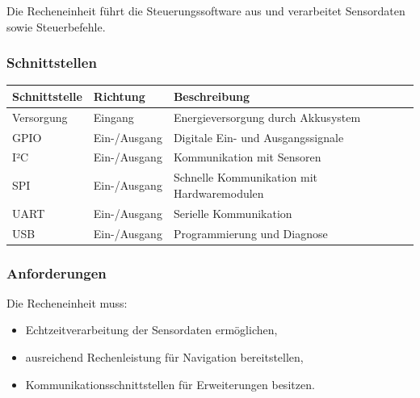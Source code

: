 \documentclass[
]{article}
\providecommand{\tightlist}{%
  \setlength{\itemsep}{0pt}\setlength{\parskip}{0pt}}
\begin{document}
Die Recheneinheit führt die Steuerungssoftware aus und verarbeitet
Sensordaten sowie Steuerbefehle.

\subsubsection{Schnittstellen}\label{schnittstellen-1}

\begin{longtable}[]{@{}
  >{\raggedright\arraybackslash}p{}
  >{\raggedright\arraybackslash}p{}
  >{\raggedright\arraybackslash}p{}@{}}
\toprule\noalign{}
\begin{minipage}[b]{\linewidth}\raggedright
Schnittstelle
\end{minipage} & \begin{minipage}[b]{\linewidth}\raggedright
Richtung
\end{minipage} & \begin{minipage}[b]{\linewidth}\raggedright
Beschreibung
\end{minipage} \\
\midrule\noalign{}
\endhead
\bottomrule\noalign{}
\endlastfoot
Versorgung & Eingang & Energieversorgung durch Akkusystem \\
GPIO & Ein-/Ausgang & Digitale Ein- und Ausgangssignale \\
I²C & Ein-/Ausgang & Kommunikation mit Sensoren \\
SPI & Ein-/Ausgang & Schnelle Kommunikation mit Hardwaremodulen \\
UART & Ein-/Ausgang & Serielle Kommunikation \\
USB & Ein-/Ausgang & Programmierung und Diagnose \\
\end{longtable}

\subsubsection{Anforderungen}\label{anforderungen-3}

Die Recheneinheit muss:

\begin{itemize}
\tightlist
\item
  Echtzeitverarbeitung der Sensordaten ermöglichen,
\item
  ausreichend Rechenleistung für Navigation bereitstellen,
\item
  Kommunikationsschnittstellen für Erweiterungen besitzen.
\end{itemize}
\end{document}
